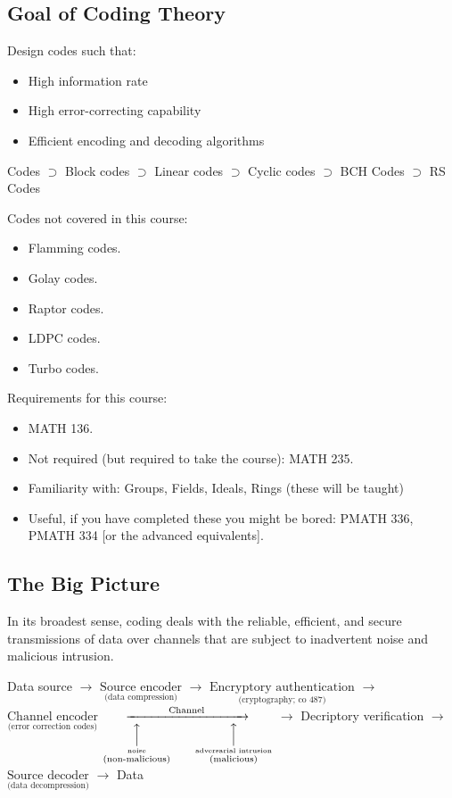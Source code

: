 \subsection*{Goal of Coding Theory}

Design codes such that:
\begin{itemize}
    \item High information rate
    \item High error-correcting capability
    \item Efficient encoding and decoding algorithms
\end{itemize}

Codes $ \supset $ Block codes $ \supset $  Linear codes
$ \supset $  Cyclic codes $ \supset $ BCH Codes
$ \supset $ RS Codes

Codes not covered in this course:
\begin{itemize}
    \item Flamming codes.
    \item Golay codes.
    \item Raptor codes.
    \item LDPC codes.
    \item Turbo codes.
\end{itemize}

Requirements for this course:
\begin{itemize}
    \item MATH 136.
    \item Not required (but required to take the course): MATH 235.
    \item Familiarity with: Groups, Fields, Ideals, Rings (these will be taught)
    \item Useful, if you have completed these you might be bored:
          PMATH 336, PMATH 334 [or the advanced equivalents].
\end{itemize}

\subsection*{The Big Picture}

In its broadest sense, coding deals with the reliable, efficient, and secure
transmissions of data over channels that are subject to inadvertent noise and
malicious intrusion.

Data source
$ \rightarrow $
$ \underset{\text{(data compression)}}{\text{Source encoder}} $
$ \rightarrow $
$ \underset{\text{(cryptography; co 487)}}{\text{Encryptory authentication}} $
$ \rightarrow $
$ \underset{\text{(error correction codes)}}{\text{Channel encoder}} $
$ \underset
    {
        \overset{\Big\uparrow}{\overset{\text{noise}}{\text{(non-malicious)}}}\qquad
        \overset{\Big\uparrow}{\overset{\text{adversarial intrusion}}{\text{(malicious)}}}
    }
    {\xrightarrow{\text{\qquad\qquad Channel\qquad\qquad}}} $
$ \rightarrow $
Decriptory verification
$ \rightarrow $
$ \underset{\text{(data decompression)}}{\text{Source decoder}}  $
$ \rightarrow $
Data
